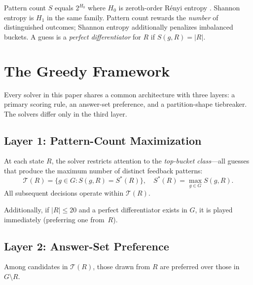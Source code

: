 \documentclass[11pt]{article}
\begin{document}
	Pattern count $S$ equals $2^{H_0}$ where $H_0$ is zeroth-order R\'enyi entropy \cite{renyi1961}.  Shannon entropy is $H_1$ in the same family.  Pattern count rewards the \emph{number} of distinguished outcomes; Shannon entropy additionally penalizes imbalanced buckets.  A guess is a \emph{perfect differentiator} for $R$ if $S(g,R) = |R|$.
	
	\section{The Greedy Framework}
	
	Every solver in this paper shares a common architecture with three layers: a primary scoring rule, an answer-set preference, and a partition-shape tiebreaker.  The solvers differ only in the third layer.
	
	\subsection{Layer 1: Pattern-Count Maximization}
	
	At each state $R$, the solver restricts attention to the \emph{top-bucket class}---all guesses that produce the maximum number of distinct feedback patterns:
	\begin{equation}\label{eq:topbucket}
		\mathcal{T}(R) = \{g \in G : S(g,R) = S^*(R)\}, \quad S^*(R) = \max_{g \in G} S(g,R).
	\end{equation}
	All subsequent decisions operate within $\mathcal{T}(R)$.
	
	Additionally, if $|R| \leq 20$ and a perfect differentiator exists in $G$, it is played immediately (preferring one from~$R$).
	
	\subsection{Layer 2: Answer-Set Preference}
	
	Among candidates in $\mathcal{T}(R)$, those drawn from $R$ are preferred over those in $G \setminus R$.
	
\end{document}

